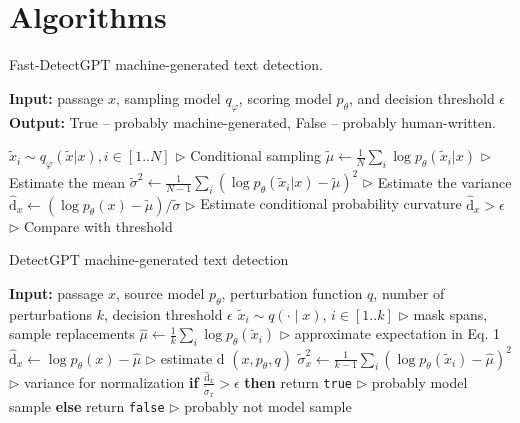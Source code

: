 \documentclass[11pt]{article}
\begin{document}
\section{Algorithms}

\begin{algorithm*}[h]
  \caption{Fast-DetectGPT machine-generated text detection.}
  \textbf{Input:} passage $x$, sampling model $q_\varphi$, scoring model $p_\theta$, and decision threshold $\epsilon$ \\
  \textbf{Output:} True -- probably machine-generated, False -- probably human-written.
  \begin{algorithmic}[1]
    \label{alg:fastdetectgpt}
    \State $\tilde{x}_i \sim q_\varphi(\tilde{x}|x), i \in [1..N]$ \hfill $\triangleright$ Conditional sampling
    \State $\tilde{\mu} \leftarrow \frac{1}{N} \sum_i \log p_\theta(\tilde{x}_i|x)$ \hfill $\triangleright$ Estimate the mean
    \State $\tilde{\sigma}^2 \leftarrow \frac{1}{N-1} \sum_i (\log p_\theta(\tilde{x}_i|x) - \tilde{\mu})^2$ \hfill $\triangleright$ Estimate the variance
    \State $\hat{\mathrm{d}}_x \leftarrow (\log p_\theta(x) - \tilde{\mu})/\tilde{\sigma}$ \hfill $\triangleright$ Estimate conditional probability curvature
    \State \Return $\hat{\mathrm{d}}_x > \epsilon$ \hfill $\triangleright$ Compare with threshold
\EndFunction
\end{algorithmic}
\end{algorithm*}

\begin{algorithm*}[h]
  \caption{DetectGPT machine-generated text detection}
  \begin{algorithmic}[1]
    \label{alg:detectgpt}
\State \textbf{Input:} passage $x$, source model $p_\theta$, perturbation function $q$, number of perturbations $k$, decision threshold $\epsilon$
\State $\tilde{x}_i \sim q(\cdot \mid x)$, $i \in [1..k]$ \hfill $\triangleright$ mask spans, sample replacements
\State $\hat{\mu} \leftarrow \frac{1}{k} \sum_i \log p_\theta(\tilde{x}_i)$ \hfill $\triangleright$ approximate expectation in Eq. 1
\State $\hat{\mathrm{d}}_x \leftarrow \log p_\theta(x) - \hat{\mu}$ \hfill $\triangleright$ estimate d $(x, p_\theta, q)$
\State $\tilde{\sigma}_x^2 \leftarrow \frac{1}{k-1} \sum_i (\log p_\theta(\tilde{x}_i) - \hat{\mu})^2$ \hfill $\triangleright$ variance for normalization
\State \textbf{if} $\frac{\hat{\mathrm{d}}_x}{\tilde{\sigma}_x} > \epsilon$ \textbf{then}
\State \quad return \texttt{true} \hfill $\triangleright$ probably model sample
\State \textbf{else}
\State \quad return \texttt{false} \hfill $\triangleright$ probably not model sample
\end{algorithmic}
\end{algorithm*}
\end{document}
